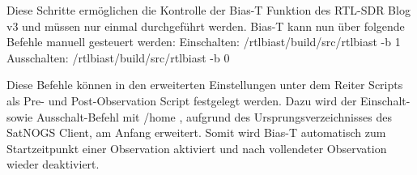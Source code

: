 Diese Schritte ermöglichen die Kontrolle der Bias-T Funktion des RTL-SDR Blog v3 und müssen nur einmal durchgeführt werden. Bias-T kann nun über folgende Befehle manuell gesteuert werden:
\newline Einschalten: \glqq /rtl\textunderscore biast/build/src/rtl\textunderscore biast -b 1\grqq{}
\newline Ausschalten: \glqq /rtl\textunderscore biast/build/src/rtl\textunderscore biast -b 0\grqq{}

Diese Befehle können in den erweiterten Einstellungen unter dem Reiter Scripts als Pre- und Post-Observation Script festgelegt werden. Dazu wird der Einschalt- sowie Ausschalt-Befehl mit \glqq /home\grqq{} , aufgrund des Ursprungsverzeichnisses des SatNOGS Client, am Anfang erweitert. Somit wird Bias-T automatisch zum Startzeitpunkt einer Observation aktiviert und nach vollendeter Observation wieder deaktiviert. 